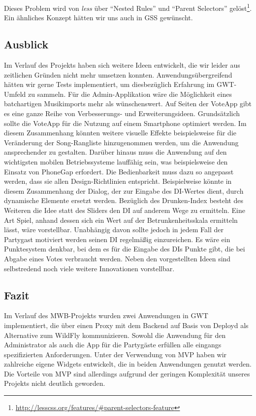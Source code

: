 Dieses Problem wird von \textit{less} über "`Nested Rules"' und "`Parent Selectors"' gelöst\footnote{\url{http://lesscss.org/features/\#parent-selectors-feature}}. Ein ähnliches Konzept
hätten wir uns auch in GSS gewünscht.

\subsection{Ausblick}
Im Verlauf des Projekts haben sich weitere Ideen entwickelt, die wir leider aus zeitlichen Gründen nicht mehr umsetzen konnten. Anwendungsübergreifend hätten wir gerne Tests implementiert, um diesbezüglich Erfahrung im GWT-Umfeld zu sammeln. Für die Admin-Applikation wäre die Möglichkeit eines batchartigen Musikimports mehr als wünschenswert. Auf Seiten der VoteApp gibt es eine ganze Reihe von Verbesserungs- und Erweiterungsideen. Grundsätzlich sollte die VoteApp für die Nutzung auf einem Smartphone optimiert werden. Im diesem Zusammenhang könnten weitere visuelle Effekte beispielsweise für die Veränderung der Song-Rangliste hinzugenommen werden, um die Anwendung ansprechender zu gestalten. Darüber hinaus muss die Anwendung auf den wichtigsten mobilen Betriebssysteme lauffähig sein, was beispielsweise den Einsatz von PhoneGap erfordert. Die Bedienbarkeit muss dazu so angepasst werden, dass sie allen Design-Richtlinien entspricht. Beispielweise könnte in diesem Zusammenhang der Dialog, der zur Eingabe des DI-Wertes dient, durch dynamische Elemente ersetzt werden. Bezüglich des Drunken-Index besteht des Weiteren die Idee statt des Sliders den DI auf anderem Wege zu ermitteln. Eine Art Spiel, anhand dessen sich ein Wert auf der Betrunkenheitsskala ermitteln lässt, wäre vorstellbar. Unabhängig davon sollte jedoch in jedem Fall der Partygast motiviert werden seinen DI regelmäßig einzureichen. Es wäre ein Punktesystem denkbar, bei dem es für die Eingabe des DIs Punkte gibt, die bei Abgabe eines Votes verbraucht werden. Neben den vorgestellten Ideen sind selbstredend noch viele weitere Innovationen vorstellbar.

\subsection{Fazit}
Im Verlauf des MWB-Projekts wurden zwei Anwendungen in GWT implementiert, die über einen Proxy mit dem Backend auf Basis von Deployd als Alternative zum WildFly kommunizieren. Sowohl die Anwendung für den Administrator als auch die App für die Partygäste erfüllen alle eingangs spezifizierten Anforderungen. Unter der Verwendung von MVP haben wir zahlreiche eigene Widgets entwickelt, die in beiden Anwendungen genutzt werden. Die Vorteile von MVP sind allerdings aufgrund der geringen Komplexität unseres Projekts nicht deutlich geworden. 

